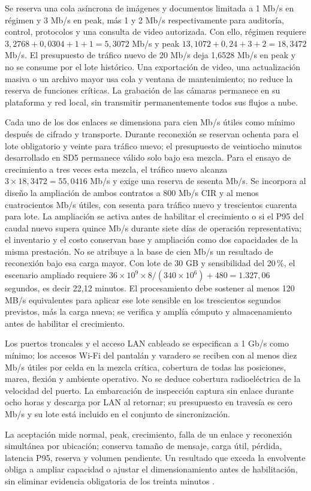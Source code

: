 Se reserva una cola asíncrona de imágenes y documentos limitada a 1 Mb/s en régimen y 3 Mb/s en peak, más 1 y 2 Mb/s respectivamente para auditoría, control, protocolos y una consulta de video autorizada. Con ello, régimen requiere $3,2768+0,0304+1+1=5,3072$ Mb/s y peak $13,1072+0,24+3+2=18,3472$ Mb/s. El presupuesto de tráfico nuevo de 20 Mb/s deja 1,6528 Mb/s en peak y no se consume por el lote histórico. Una exportación de video, una actualización masiva o un archivo mayor usa cola y ventana de mantenimiento; no reduce la reserva de funciones críticas. La grabación de las cámaras permanece en su plataforma y red local, sin transmitir permanentemente todos sus flujos a nube.

Cada uno de los dos enlaces se dimensiona para cien Mb/s útiles como mínimo después de cifrado y transporte. Durante reconexión se reservan ochenta para el lote obligatorio y veinte para tráfico nuevo; el presupuesto de veintiocho minutos desarrollado en SD5 permanece válido solo bajo esa mezcla. Para el ensayo de crecimiento a tres veces esta mezcla, el tráfico nuevo alcanza $3\times18,3472=55,0416$ Mb/s y exige una reserva de sesenta Mb/s. Se incorpora al diseño la ampliación de ambos contratos a 800 Mb/s CIR y al menos cuatrocientos Mb/s útiles, con sesenta para tráfico nuevo y trescientos cuarenta para lote. La ampliación se activa antes de habilitar el crecimiento o si el P95 del caudal nuevo supera quince Mb/s durante siete días de operación representativa; el inventario y el costo conservan base y ampliación como dos capacidades de la misma prestación. No se atribuye a la base de cien Mb/s un resultado de reconexión bajo esa carga mayor. Con lote de 30 GB y sensibilidad del 20\,\%, el escenario ampliado requiere $36\times10^9\times8/(340\times10^6)+480=1.327,06$ segundos, es decir 22,12 minutos. El procesamiento debe sostener al menos 120 MB/s equivalentes para aplicar ese lote sensible en los trescientos segundos previstos, más la carga nueva; se verifica y amplía cómputo y almacenamiento antes de habilitar el crecimiento.

Los puertos troncales y el acceso LAN cableado se especifican a 1 Gb/s como mínimo; los accesos Wi-Fi del pantalán y varadero se reciben con al menos diez Mb/s útiles por celda en la mezcla crítica, cobertura de todas las posiciones, marea, flexión y ambiente operativo. No se deduce cobertura radioeléctrica de la velocidad del puerto. La embarcación de inspección captura sin enlace durante ocho horas y descarga por LAN al retornar; su presupuesto en travesía es cero Mb/s y su lote está incluido en el conjunto de sincronización.

La aceptación mide normal, peak, crecimiento, falla de un enlace y reconexión simultánea por ubicación; conserva tamaño de mensaje, carga útil, pérdida, latencia P95, reserva y volumen pendiente. Un resultado que exceda la envolvente obliga a ampliar capacidad o ajustar el dimensionamiento antes de habilitación, sin eliminar evidencia obligatoria de los treinta minutos \parencites[RT-03.20, p.~9]{pucv-transversal}[cap.~15, RT-03.10/13]{caso07}.
